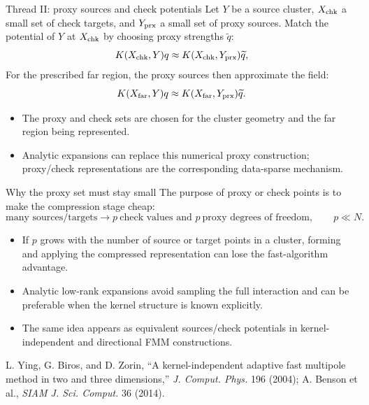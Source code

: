 \documentclass[aspectratio=169,11pt]{beamer}
\begin{document}
\begin{frame}{Thread II: proxy sources and check potentials}
\small
Let $Y$ be a source cluster, $X_{\rm chk}$ a small set of check targets, and
$Y_{\rm prx}$ a small set of proxy sources.  Match the potential of $Y$ at
$X_{\rm chk}$ by choosing proxy strengths $\widetilde q$:
\[
  K(X_{\rm chk},Y)q
  \approx K(X_{\rm chk},Y_{\rm prx})\widetilde q,
\]
For the prescribed far region, the proxy sources then approximate the field:
\[
  K(X_{\rm far},Y)q
  \approx K(X_{\rm far},Y_{\rm prx})\widetilde q.
\]
\begin{itemize}
  \item The proxy and check sets are chosen for the cluster geometry and the
  far region being represented.
  \item Analytic expansions can replace this numerical proxy construction;
  proxy/check representations are the corresponding data-sparse mechanism.
\end{itemize}
\end{frame}

\begin{frame}{Why the proxy set must stay small}
\small
The purpose of proxy or check points is to make the compression stage cheap:
\[
  \text{many sources/targets}
  \longrightarrow
  p\ \text{check values and }p\ \text{proxy degrees of freedom},
  \qquad p\ll N.
\]
\begin{itemize}
  \item If $p$ grows with the number of source or target points in a cluster,
  forming and applying the compressed representation can lose the
  fast-algorithm advantage.
  \item Analytic low-rank expansions avoid sampling the full interaction and
  can be preferable when the kernel structure is known explicitly.
  \item The same idea appears as equivalent sources/check potentials in
  kernel-independent and directional FMM constructions.
\end{itemize}
{\scriptsize\color{mygray}L. Ying, G. Biros, and D. Zorin, ``A kernel-independent adaptive fast multipole method in two and three dimensions,''
\emph{J. Comput. Phys.} 196 (2004); A. Benson et al., \emph{SIAM J. Sci. Comput.} 36 (2014).}
\end{frame}
\end{document}
